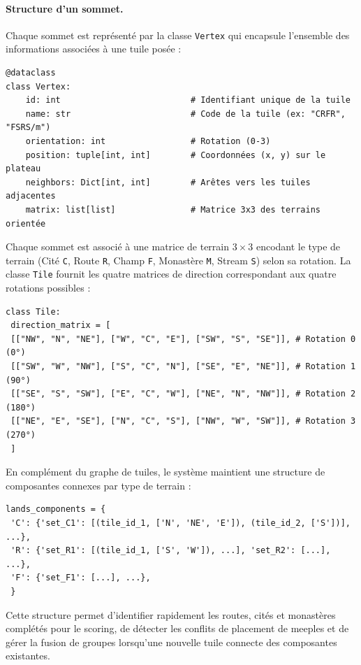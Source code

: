 \documentclass[11pt]{article}
\begin{document}
\paragraph{Structure d'un sommet.}
Chaque sommet est représenté par la classe \texttt{Vertex} qui 
encapsule l'ensemble des informations associées à une tuile posée :


{\normalsize
  \begin{verbatim}
@dataclass
class Vertex:
    id: int                          # Identifiant unique de la tuile
    name: str                        # Code de la tuile (ex: "CRFR", "FSRS/m")
    orientation: int                 # Rotation (0-3)
    position: tuple[int, int]        # Coordonnées (x, y) sur le plateau
    neighbors: Dict[int, int]        # Arêtes vers les tuiles adjacentes
    matrix: list[list]               # Matrice 3x3 des terrains orientée
\end{verbatim}
}

Chaque sommet est associé à une matrice de terrain $3 \times 3$ 
encodant le type de terrain (Cité \texttt{C}, Route \texttt{R}, 
Champ \texttt{F}, Monastère \texttt{M}, Stream \texttt{S}) selon sa 
rotation. La classe \texttt{Tile} fournit les quatre matrices de 
direction correspondant aux quatre rotations possibles :

{\normalsize
  \begin{verbatim}
class Tile:
 direction_matrix = [
 [["NW", "N", "NE"], ["W", "C", "E"], ["SW", "S", "SE"]], # Rotation 0 (0°)
 [["SW", "W", "NW"], ["S", "C", "N"], ["SE", "E", "NE"]], # Rotation 1 (90°)
 [["SE", "S", "SW"], ["E", "C", "W"], ["NE", "N", "NW"]], # Rotation 2 (180°)
 [["NE", "E", "SE"], ["N", "C", "S"], ["NW", "W", "SW"]], # Rotation 3 (270°)
 ]
\end{verbatim}
}

En complément du graphe de tuiles, le système maintient une structure 
de composantes connexes par type de terrain :

{\normalsize
  \begin{verbatim}
lands_components = {
 'C': {'set_C1': [(tile_id_1, ['N', 'NE', 'E']), (tile_id_2, ['S'])], ...},
 'R': {'set_R1': [(tile_id_1, ['S', 'W']), ...], 'set_R2': [...], ...},
 'F': {'set_F1': [...], ...},
 }		
\end{verbatim}
}
Cette structure permet d'identifier rapidement les routes, cités et 
monastères complétés pour le scoring, de détecter les conflits de 
placement de meeples et de gérer la fusion de groupes lorsqu'une 
nouvelle tuile connecte des composantes existantes.
\end{document}
